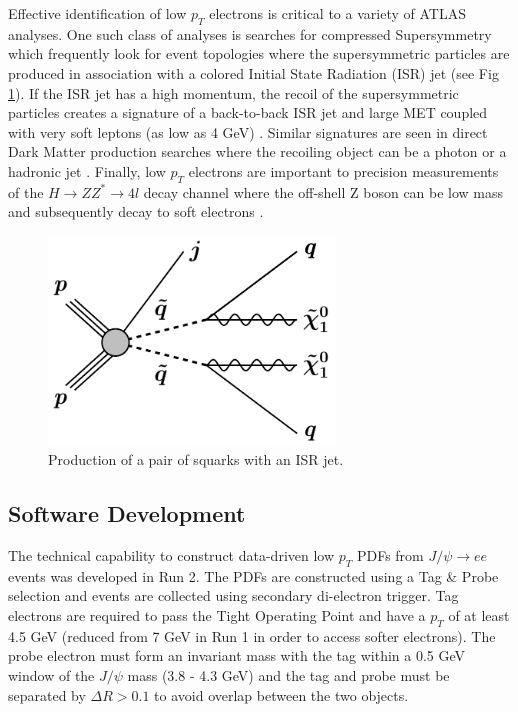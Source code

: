 Effective identification of low $p_T$ electrons is critical to a variety of ATLAS analyses. One such class of analyses is searches for compressed Supersymmetry which frequently look for event topologies where the supersymmetric particles are produced in association with a colored Initial State Radiation (ISR) jet (see Fig \ref{isr_susy}). If the ISR jet has a high momentum, the recoil of the supersymmetric particles creates a signature of a back-to-back ISR jet and large MET coupled with very soft leptons (as low as 4 GeV) \cite{soft_lep_susy}. Similar signatures are seen in direct Dark Matter production searches where the recoiling object can be a photon\cite{dm_photon} or a hadronic jet \cite{dm_jet}. Finally, low $p_T$ electrons are important to precision measurements of the $H\rightarrow ZZ^*\rightarrow 4l$ decay channel where the off-shell Z boson can be low mass and subsequently decay to soft electrons \cite{h_4l}.

\begin{figure}[hb!]
    \centering
    \includegraphics[width=3in]{figures/chapter5/isr_susy.pdf}
    \caption{Production of a pair of squarks with an ISR jet\cite{dm_jet}.}
    \label{isr_susy}
\end{figure}


\subsection{Software Development}\label{sec:low_pt_soft}
The technical capability to construct data-driven low $p_T$ PDFs from $J/\psi\rightarrow ee$ events was developed in Run 2. The PDFs are constructed using a Tag \& Probe selection and events are collected using secondary di-electron trigger. Tag electrons are required to pass the Tight Operating Point and have a $p_T$ of at least 4.5 GeV (reduced from 7 GeV in Run 1 in order to access softer electrons). The probe electron must form an invariant mass with the tag within a 0.5 GeV window of the $J/\psi$ mass (3.8 - 4.3 GeV) and the tag and probe must be separated by $\Delta R> 0.1$ to avoid overlap between the two objects. \\

